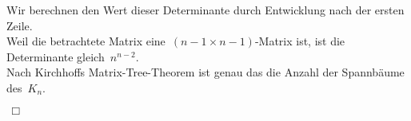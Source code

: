 Wir berechnen den Wert dieser Determinante durch Entwicklung nach der ersten Zeile. \\
Weil die betrachtete Matrix eine $\,(n-1 \times n-1)$-Matrix ist, ist die Determinante gleich $\,n^{n-2}$.\; \\
Nach Kirchhoffs Matrix-Tree-Theorem ist genau das die Anzahl der Spannbäume des $\,K_n$.\; 
\begin{flushright} $\,\Box\,$ \end{flushright} 
